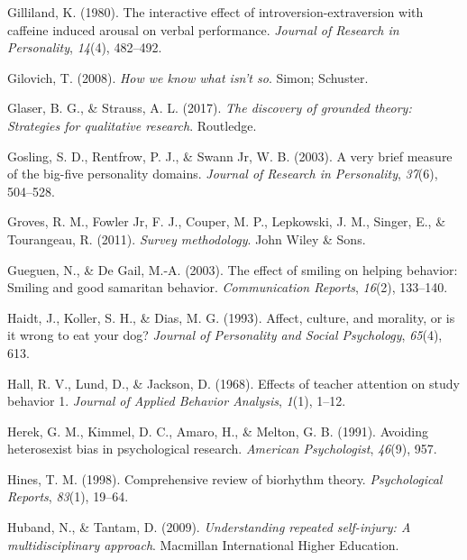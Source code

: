 \documentclass[
]{krantz}
\newlength{\cslhangindent}
\newlength{\cslentryspacingunit} %
\newenvironment{CSLReferences}[2] %
 {%
  \setlength{\parindent}{0pt}
  \ifodd #1
  \let\oldpar\par
  \def\par{\hangindent=\cslhangindent\oldpar}
  \fi
  \setlength{\parskip}{#2\cslentryspacingunit}
 }%
 {}
\begin{document}
\begin{CSLReferences}{1}{0}
\leavevmode{}%
Gilliland, K. (1980). The interactive effect of introversion-extraversion with caffeine induced arousal on verbal performance. \emph{Journal of Research in Personality}, \emph{14}(4), 482--492.

\leavevmode{}%
Gilovich, T. (2008). \emph{How we know what isn't so}. Simon; Schuster.

\leavevmode{}%
Glaser, B. G., \& Strauss, A. L. (2017). \emph{The discovery of grounded theory: Strategies for qualitative research}. Routledge.

\leavevmode{}%
Gosling, S. D., Rentfrow, P. J., \& Swann Jr, W. B. (2003). A very brief measure of the big-five personality domains. \emph{Journal of Research in Personality}, \emph{37}(6), 504--528.

\leavevmode{}%
Groves, R. M., Fowler Jr, F. J., Couper, M. P., Lepkowski, J. M., Singer, E., \& Tourangeau, R. (2011). \emph{Survey methodology}. John Wiley \& Sons.

\leavevmode{}%
Gueguen, N., \& De Gail, M.-A. (2003). The effect of smiling on helping behavior: Smiling and good samaritan behavior. \emph{Communication Reports}, \emph{16}(2), 133--140.

\leavevmode{}%
Haidt, J., Koller, S. H., \& Dias, M. G. (1993). Affect, culture, and morality, or is it wrong to eat your dog? \emph{Journal of Personality and Social Psychology}, \emph{65}(4), 613.

\leavevmode{}%
Hall, R. V., Lund, D., \& Jackson, D. (1968). Effects of teacher attention on study behavior 1. \emph{Journal of Applied Behavior Analysis}, \emph{1}(1), 1--12.

\leavevmode{}%
Herek, G. M., Kimmel, D. C., Amaro, H., \& Melton, G. B. (1991). Avoiding heterosexist bias in psychological research. \emph{American Psychologist}, \emph{46}(9), 957.

\leavevmode{}%
Hines, T. M. (1998). Comprehensive review of biorhythm theory. \emph{Psychological Reports}, \emph{83}(1), 19--64.

\leavevmode{}%
Huband, N., \& Tantam, D. (2009). \emph{Understanding repeated self-injury: A multidisciplinary approach}. Macmillan International Higher Education.


\end{CSLReferences}
\end{document}

